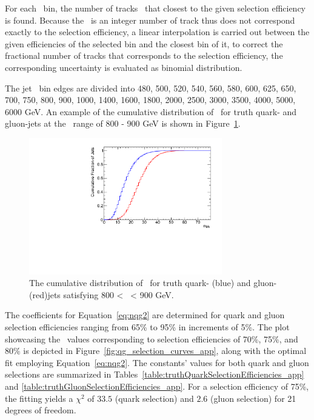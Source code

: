 For each \pt~bin, the number of tracks \ntrk\ that closest to the given selection efficiency is found. Because the \ntrk~is an integer number of track thus does not correspond exactly to the selection efficiency, a linear interpolation is carried out between the given efficiencies of the selected bin and the closest bin of it, to correct the  fractional number of tracks that corresponds to the selection efficiency, the corresponding uncertainty is evaluated as binomial distribution. 


The jet \pt~bin edges are divided into 
480, 500, 520, 540, 560, 580, 600, 625, 650, 700, 750, 800, 900, 1000, 1400, 
1600, 1800, 2000, 2500, 3000, 3500, 4000, 5000, 6000 GeV. An example of the cumulative 
distribution of \ntrk~for truth quark- and gluon-jets at the \pt~range of 800 - 900 GeV is shown in
Figure~\ref{fig:ntrk_cumulative_app}.


\begin{figure}[htb]
 \centering
\includegraphics[width=0.75\textwidth]{fig/tagging_variation/Cumulative_ntrk_distribution_12_800_900GeV.pdf}
\caption{The cumulative distribution of \ntrk\ for truth quark- (blue) and gluon- (red)jets 
satisfying 800 < \pt~< 900 GeV.  \label{fig:ntrk_cumulative_app}}
\end{figure}

The coefficients for Equation~\ref{eq:nqg2} are determined for quark and gluon selection efficiencies ranging from 65\% to 95\% in increments of 5\%. The plot showcasing the \ntrk\ values corresponding to selection efficiencies of 70\%, 75\%, and 80\% is depicted in Figure~\ref{fig:qg_selection_curves_app}, along with the optimal fit employing Equation~\ref{eq:nqg2}. The constants' values for both quark and gluon selections are summarized in Tables~\ref{table:truthQuarkSelectionEfficiencies_app} and \ref{table:truthGluonSelectionEfficiencies_app}. For a selection efficiency of 75\%, the fitting yields a $\chi^2$ of $33.5$ (quark selection) and $2.6$ (gluon selection) for 21 degrees of freedom.

